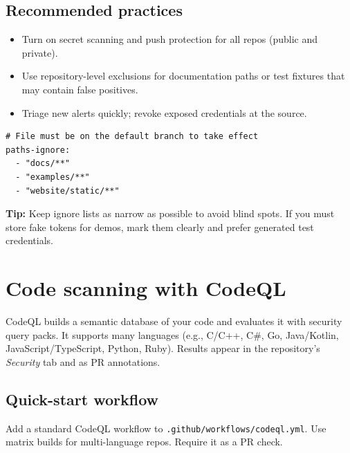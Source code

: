 \documentclass[11pt]{article}
\begin{document}
\subsection{Recommended practices}
\begin{itemize}
  \item Turn on secret scanning and push protection for all repos (public and private).
  \item Use repository-level exclusions for documentation paths or test fixtures that may contain false positives.
  \item Triage new alerts quickly; revoke exposed credentials at the source.
\end{itemize}

\begin{listing}[H]
\caption{\texttt{.github/secret\_scanning.yml} (ignore paths)}
\begin{verbatim}
# File must be on the default branch to take effect
paths-ignore:
  - "docs/**"
  - "examples/**"
  - "website/static/**"
\end{verbatim}
\end{listing}

\begin{tcolorbox}
\textbf{Tip:} Keep ignore lists as narrow as possible to avoid blind spots. If you must store fake tokens for demos, mark them clearly and prefer generated test credentials.
\end{tcolorbox}
\newpage

\section{Code scanning with CodeQL}
CodeQL builds a semantic database of your code and evaluates it with security query packs. It supports many languages (e.g., C/C++, C\#, Go, Java/Kotlin, JavaScript/TypeScript, Python, Ruby). Results appear in the repository's \emph{Security} tab and as PR annotations.

\subsection{Quick-start workflow}
Add a standard CodeQL workflow to \texttt{.github/workflows/codeql.yml}. Use matrix builds for multi-language repos. Require it as a PR check.
\end{document}
